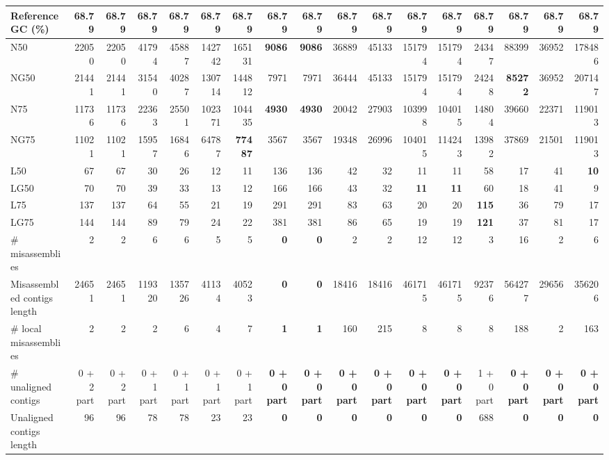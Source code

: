 \documentclass[12pt,a4paper]{article}
\begin{document}
\begin{table}[ht]
\begin{center}
\begin{tabular}{|l*{16}{|r}|}
Reference GC (\%) & 68.79 & 68.79 & 68.79 & 68.79 & 68.79 & 68.79 & 68.79 & 68.79 & 68.79 & 68.79 & 68.79 & 68.79 & 68.79 & 68.79 & 68.79 & 68.79 \\ \hline
N50 & 22050 & 22050 & 41794 & 45887 & 142742 & 165131 & {\bf 9086} & {\bf 9086} & 36889 & 45133 & 151794 & 151794 & 24347 & 88399 & 36952 & 178486 \\ \hline
NG50 & 21441 & 21441 & 31540 & 40287 & 130714 & 144812 & 7971 & 7971 & 36444 & 45133 & 151794 & 151794 & 24248 & {\bf 85272} & 36952 & 207147 \\ \hline
N75 & 11736 & 11736 & 22363 & 25501 & 102371 & 104435 & {\bf 4930} & {\bf 4930} & 20042 & 27903 & 103998 & 104015 & 14804 & 39660 & 22371 & 119013 \\ \hline
NG75 & 11021 & 11021 & 15957 & 16846 & 64787 & {\bf 77487} & 3567 & 3567 & 19348 & 26996 & 104015 & 114243 & 13982 & 37869 & 21501 & 119013 \\ \hline
L50 & 67 & 67 & 30 & 26 & 12 & 11 & 136 & 136 & 42 & 32 & 11 & 11 & 58 & 17 & 41 & {\bf 10} \\ \hline
LG50 & 70 & 70 & 39 & 33 & 13 & 12 & 166 & 166 & 43 & 32 & {\bf 11} & {\bf 11} & 60 & 18 & 41 & 9 \\ \hline
L75 & 137 & 137 & 64 & 55 & 21 & 19 & 291 & 291 & 83 & 63 & 20 & 20 & {\bf 115} & 36 & 79 & 17 \\ \hline
LG75 & 144 & 144 & 89 & 79 & 24 & 22 & 381 & 381 & 86 & 65 & 19 & 19 & {\bf 121} & 37 & 81 & 17 \\ \hline
\# misassemblies & 2 & 2 & 6 & 6 & 5 & 5 & {\bf 0} & {\bf 0} & 2 & 2 & 12 & 12 & 3 & 16 & 2 & 6 \\ \hline
Misassembled contigs length & 24651 & 24651 & 119320 & 135726 & 41134 & 40523 & {\bf 0} & {\bf 0} & 18416 & 18416 & 461715 & 461715 & 92376 & 564277 & 29656 & 356206 \\ \hline
\# local misassemblies & 2 & 2 & 2 & 6 & 4 & 7 & {\bf 1} & {\bf 1} & 160 & 215 & 8 & 8 & 8 & 188 & 2 & 163 \\ \hline
\# unaligned contigs & 0 + 2 part & 0 + 2 part & 0 + 1 part & 0 + 1 part & 0 + 1 part & 0 + 1 part & {\bf 0 + 0 part} & {\bf 0 + 0 part} & {\bf 0 + 0 part} & {\bf 0 + 0 part} & {\bf 0 + 0 part} & {\bf 0 + 0 part} & 1 + 0 part & {\bf 0 + 0 part} & {\bf 0 + 0 part} & {\bf 0 + 0 part} \\ \hline
Unaligned contigs length & 96 & 96 & 78 & 78 & 23 & 23 & {\bf 0} & {\bf 0} & {\bf 0} & {\bf 0} & {\bf 0} & {\bf 0} & 688 & {\bf 0} & {\bf 0} & {\bf 0} \\ \hline

\end{tabular}
\end{center}
\end{table}
\end{document}
